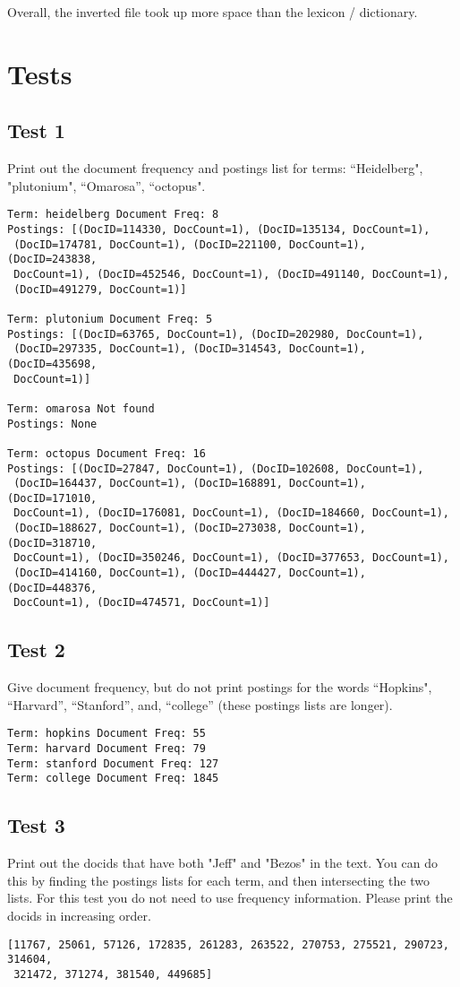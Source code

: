 \documentclass{article}
\begin{document}
Overall, the inverted file took up more space than the lexicon / dictionary. 

 


\section{Tests}
\label{Tests}
\subsection{Test 1}
Print out the document frequency and postings list for terms: “Heidelberg", "plutonium", “Omarosa”, “octopus".
\begin{verbatim}
Term: heidelberg Document Freq: 8
Postings: [(DocID=114330, DocCount=1), (DocID=135134, DocCount=1),
 (DocID=174781, DocCount=1), (DocID=221100, DocCount=1), (DocID=243838,
 DocCount=1), (DocID=452546, DocCount=1), (DocID=491140, DocCount=1),
 (DocID=491279, DocCount=1)]

Term: plutonium Document Freq: 5
Postings: [(DocID=63765, DocCount=1), (DocID=202980, DocCount=1),
 (DocID=297335, DocCount=1), (DocID=314543, DocCount=1), (DocID=435698,
 DocCount=1)]

Term: omarosa Not found
Postings: None

Term: octopus Document Freq: 16
Postings: [(DocID=27847, DocCount=1), (DocID=102608, DocCount=1),
 (DocID=164437, DocCount=1), (DocID=168891, DocCount=1), (DocID=171010,
 DocCount=1), (DocID=176081, DocCount=1), (DocID=184660, DocCount=1),
 (DocID=188627, DocCount=1), (DocID=273038, DocCount=1), (DocID=318710,
 DocCount=1), (DocID=350246, DocCount=1), (DocID=377653, DocCount=1),
 (DocID=414160, DocCount=1), (DocID=444427, DocCount=1), (DocID=448376,
 DocCount=1), (DocID=474571, DocCount=1)]
\end{verbatim}


\subsection{Test 2}
Give document frequency, but do not print postings for the words “Hopkins", “Harvard”, “Stanford”, and, “college” (these postings lists are longer).
\begin{verbatim}
Term: hopkins Document Freq: 55
Term: harvard Document Freq: 79
Term: stanford Document Freq: 127
Term: college Document Freq: 1845
\end{verbatim}

\subsection{Test 3}
Print out the docids that have both "Jeff" and "Bezos" in the text. You can do this by finding the postings lists for
each term, and then intersecting the two lists. For this test you do not need to use frequency information. Please print
the docids in increasing order.
\begin{verbatim}
[11767, 25061, 57126, 172835, 261283, 263522, 270753, 275521, 290723, 314604,
 321472, 371274, 381540, 449685]
\end{verbatim}
\end{document}
